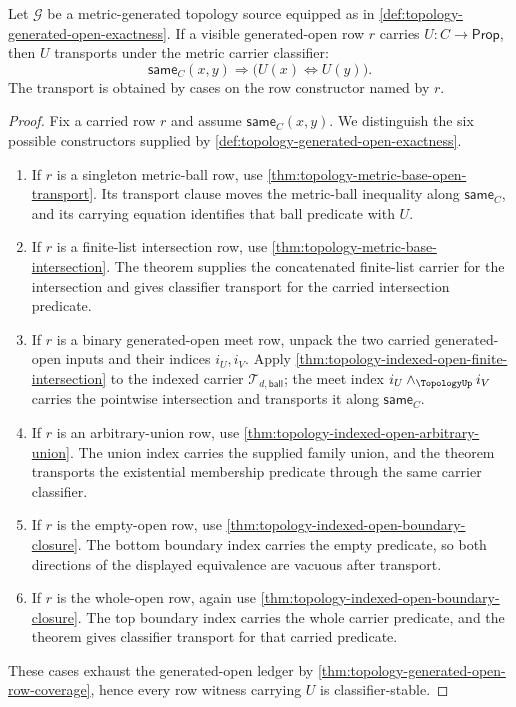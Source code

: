 \begin{theorem}
\label{thm:topology-generated-open-classification-soundness}
Let $\mathcal{G}$ be a metric-generated topology source equipped as in \autoref{def:topology-generated-open-exactness}. If a visible generated-open row $r$ carries $U:C\to\mathsf{Prop}$, then $U$ transports under the metric carrier classifier:
$$
\mathsf{same}_C(x,y)
\Longrightarrow
\bigl(U(x)\Longleftrightarrow U(y)\bigr).
$$
The transport is obtained by cases on the row constructor named by $r$.
\end{theorem}
\begin{proof}
Fix a carried row $r$ and assume $\mathsf{same}_C(x,y)$. We distinguish the six possible constructors supplied by \autoref{def:topology-generated-open-exactness}.

\begin{enumerate}
\item If $r$ is a singleton metric-ball row, use \autoref{thm:topology-metric-base-open-transport}. Its transport clause moves the metric-ball inequality along $\mathsf{same}_C$, and its carrying equation identifies that ball predicate with $U$.

\item If $r$ is a finite-list intersection row, use \autoref{thm:topology-metric-base-intersection}. The theorem supplies the concatenated finite-list carrier for the intersection and gives classifier transport for the carried intersection predicate.

\item If $r$ is a binary generated-open meet row, unpack the two carried generated-open inputs and their indices $i_U,i_V$. Apply \autoref{thm:topology-indexed-open-finite-intersection} to the indexed carrier $\mathcal{T}_{d,\mathsf{ball}}$; the meet index $i_U\wedge_{\TopologyUp}i_V$ carries the pointwise intersection and transports it along $\mathsf{same}_C$.

\item If $r$ is an arbitrary-union row, use \autoref{thm:topology-indexed-open-arbitrary-union}. The union index carries the supplied family union, and the theorem transports the existential membership predicate through the same carrier classifier.

\item If $r$ is the empty-open row, use \autoref{thm:topology-indexed-open-boundary-closure}. The bottom boundary index carries the empty predicate, so both directions of the displayed equivalence are vacuous after transport.

\item If $r$ is the whole-open row, again use \autoref{thm:topology-indexed-open-boundary-closure}. The top boundary index carries the whole carrier predicate, and the theorem gives classifier transport for that carried predicate.
\end{enumerate}

These cases exhaust the generated-open ledger by \autoref{thm:topology-generated-open-row-coverage}, hence every row witness carrying $U$ is classifier-stable.
\end{proof}

